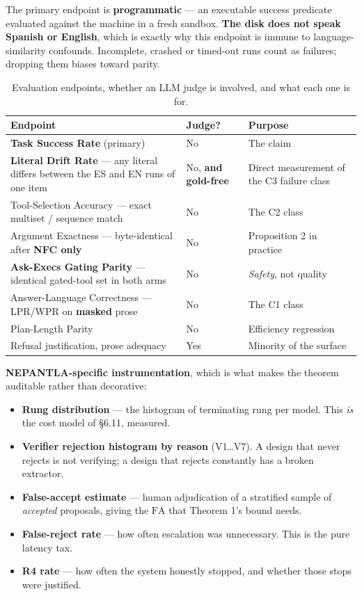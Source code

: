 The primary endpoint is \textbf{programmatic} --- an executable success predicate
evaluated against the machine in a fresh sandbox. \textbf{The disk does not speak
Spanish or English}, which is exactly why this endpoint is immune to
language-similarity confounds. Incomplete, crashed or timed-out runs count as
failures; dropping them biases toward parity.

\begin{table}[htbp]
\centering
\footnotesize
\caption{Evaluation endpoints, whether an LLM judge is involved, and what each one is for.}
\label{tab:evaluation-endpoints}
\begin{tabular}{@{}p{}p{}p{}@{}}
\toprule
\textbf{Endpoint} & \textbf{Judge?} & \textbf{Purpose} \\
\midrule
\textbf{Task Success Rate} (primary) & No & The claim \\
\addlinespace
\textbf{Literal Drift Rate} --- any literal differs between the ES and EN runs of one
item & No, \textbf{and gold-free} & Direct measurement of the C3 failure class \\
\addlinespace
Tool-Selection Accuracy --- exact multiset / sequence match & No & The C2 class \\
\addlinespace
Argument Exactness --- byte-identical after \textbf{NFC only} & No & Proposition 2 in
practice \\
\addlinespace
\textbf{Ask-Execs Gating Parity} --- identical gated-tool set in both arms & No &
\emph{Safety}, not quality \\
\addlinespace
Answer-Language Correctness --- LPR/WPR on \textbf{masked} prose & No & The C1 class \\
\addlinespace
Plan-Length Parity & No & Efficiency regression \\
\addlinespace
Refusal justification, prose adequacy & Yes & Minority of the surface \\
\bottomrule
\end{tabular}
\end{table}

\textbf{NEPANTLA-specific instrumentation}, which is what makes the theorem auditable
rather than decorative:

\begin{itemize}
  \item \textbf{Rung distribution} --- the histogram of terminating rung per model.
        This \emph{is} the cost model of \S6.11, measured.
  \item \textbf{Verifier rejection histogram by reason} (V1\ldots V7). A design that
        never rejects is not verifying; a design that rejects constantly has a broken
        extractor.
  \item \textbf{False-accept estimate} --- human adjudication of a stratified sample
        of \emph{accepted} proposals, giving the $\mathrm{FA}$ that Theorem 1's bound
        needs.
  \item \textbf{False-reject rate} --- how often escalation was unnecessary. This is
        the pure latency tax.
  \item \textbf{R4 rate} --- how often the system honestly stopped, and whether those
        stops were justified.
\end{itemize}

